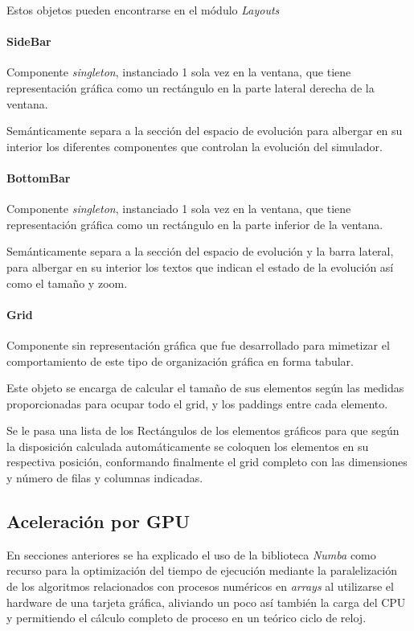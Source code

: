 \documentclass[]{article}
\begin{document}
			Estos objetos pueden encontrarse en el módulo \textit{Layouts}
				
			\paragraph{SideBar}
				Componente \textit{singleton}, instanciado 1 sola vez en la ventana, que tiene representación gráfica como un rectángulo en la parte lateral derecha de la ventana.
				
				Semánticamente separa a la sección del espacio de evolución para albergar en su interior los diferentes componentes que controlan la evolución del simulador.
				
			\paragraph{BottomBar}
				Componente \textit{singleton}, instanciado 1 sola vez en la ventana, que tiene representación gráfica como un rectángulo en la parte inferior de la ventana.
				
				Semánticamente separa a la sección del espacio de evolución y la barra lateral, para albergar en su interior los textos que indican el estado de la evolución así como el tamaño y zoom.
				
			\paragraph{Grid}
				Componente sin representación gráfica que fue desarrollado para mimetizar el comportamiento de este tipo de organización gráfica en forma tabular.
				
				Este objeto se encarga de calcular el tamaño de sus elementos según las medidas proporcionadas para ocupar todo el grid, y los paddings entre cada elemento.
				
				Se le pasa una lista de los Rectángulos de los elementos gráficos para que según la disposición calculada automáticamente se coloquen los elementos en su respectiva posición, conformando finalmente el grid completo con las dimensiones y número de filas y columnas indicadas.
	
	\newpage
	\subsection{Aceleración por GPU}
		En secciones anteriores se ha explicado el uso de la biblioteca \textit{Numba} como recurso para la optimización del tiempo de ejecución mediante la paralelización de los algoritmos relacionados con procesos numéricos en \textit{arrays} al utilizarse el hardware de una tarjeta gráfica, aliviando un poco así también la carga del CPU y permitiendo el cálculo completo de proceso en un teórico ciclo de reloj.
		
\end{document}

